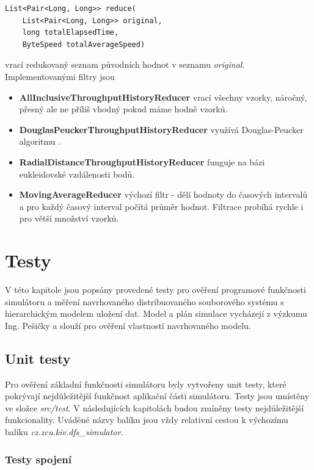 \documentclass[czech,DP]{thesiskiv}
\begin{document}
\begin{verbatim}
List<Pair<Long, Long>> reduce(
    List<Pair<Long, Long>> original, 
    long totalElapsedTime, 
    ByteSpeed totalAverageSpeed)
\end{verbatim}
\noindent vrací redukovaný seznam původních hodnot v seznamu \textit{original}. Implementovanými filtry jsou

\begin{itemize}
\item \textbf{AllInclusiveThroughputHistoryReducer} vrací všechny vzorky, náročný, přesný ale ne příliš vhodný pokud máme hodně vzorků.
\item \textbf{DouglasPeuckerThroughputHistoryReducer} využívá Douglas-Peucker algoritmu \cite{douglaspeuckeralg}.
\item \textbf{RadialDistanceThroughputHistoryReducer} funguje na bázi eukleidovské vzdálenosti bodů.
\item \textbf{MovingAverageReducer} výchozí filtr - dělí hodnoty do časových intervalů a pro každý časový interval počítá průměr hodnot. Filtrace probíhá rychle i pro větší množství vzorků.
\end{itemize}

\chapter{Testy} \label{testy}

V této kapitole jsou popsány provedené testy pro ověření programové funkčnosti simulátoru a měření navrhovaného distribuovaného souborového systému s hierarchickým modelem uložení dat. Model a plán simulace vycházejí z výzkumu Ing. Pešičky a slouží pro ověření vlastností navrhovaného modelu.

\section{Unit testy} \label{unittesty}

Pro ověření základní funkčnosti simulátoru byly vytvořeny unit testy, které pokrývají nejdůležitější funkčnost aplikační části simulátoru. Testy jsou umístěny ve složce \textit{src/test}. V následujících kapitolách budou zmíněny testy nejdůležitější funkcionality. Uváděné názvy balíku jsou vždy relativní cestou k výchozímu balíku \textit{cz.zcu.kiv.dfs\_simulator}.

\subsection{Testy spojení}
\end{document}
